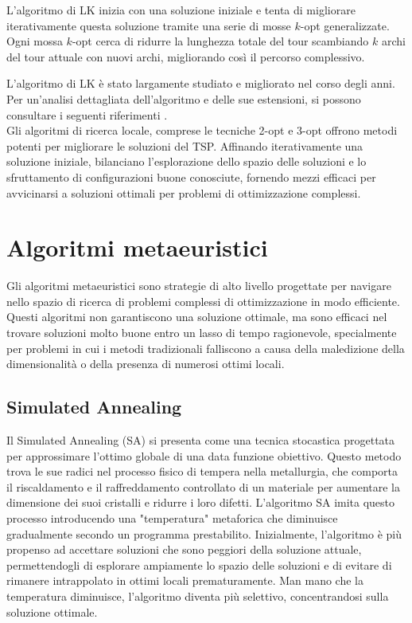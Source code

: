 L'algoritmo di \Gls{LK} inizia con una soluzione iniziale e tenta di migliorare iterativamente questa soluzione tramite una serie di mosse \(k\)-opt generalizzate. Ogni mossa \(k\)-opt cerca di ridurre la lunghezza totale del tour scambiando \(k\) archi del tour attuale con nuovi archi, migliorando così il percorso complessivo.


L'algoritmo di \Gls{LK} è stato largamente studiato e migliorato nel corso degli anni. Per un'analisi dettagliata dell'algoritmo e delle sue estensioni, si possono consultare i seguenti riferimenti \cite{Johnson2002,Lawler1985,Gutin2016}.
\\

Gli algoritmi di ricerca locale, comprese le tecniche 2-opt e 3-opt offrono metodi potenti per migliorare le soluzioni del \Gls{TSP}. Affinando iterativamente una soluzione iniziale, bilanciano l'esplorazione dello spazio delle soluzioni e lo sfruttamento di configurazioni buone conosciute, fornendo mezzi efficaci per avvicinarsi a soluzioni ottimali per problemi di ottimizzazione complessi.


\section{Algoritmi metaeuristici}

Gli algoritmi metaeuristici sono strategie di alto livello progettate per navigare nello spazio di ricerca di problemi complessi di ottimizzazione in modo efficiente. Questi algoritmi non garantiscono una soluzione ottimale, ma sono efficaci nel trovare soluzioni molto buone entro un lasso di tempo ragionevole, specialmente per problemi in cui i metodi tradizionali falliscono a causa della maledizione della dimensionalità o della presenza di numerosi ottimi locali.

\subsection{Simulated Annealing}

Il Simulated Annealing (\Gls{SA}) si presenta come una tecnica stocastica progettata per approssimare l'ottimo globale di una data funzione obiettivo. Questo metodo trova le sue radici nel processo fisico di tempera nella metallurgia, che comporta il riscaldamento e il raffreddamento controllato di un materiale per aumentare la dimensione dei suoi cristalli e ridurre i loro difetti. L'algoritmo SA imita questo processo introducendo una "temperatura" metaforica che diminuisce gradualmente secondo un programma prestabilito. Inizialmente, l'algoritmo è più propenso ad accettare soluzioni che sono peggiori della soluzione attuale, permettendogli di esplorare ampiamente lo spazio delle soluzioni e di evitare di rimanere intrappolato in ottimi locali prematuramente. Man mano che la temperatura diminuisce, l'algoritmo diventa più selettivo, concentrandosi sulla soluzione ottimale.

